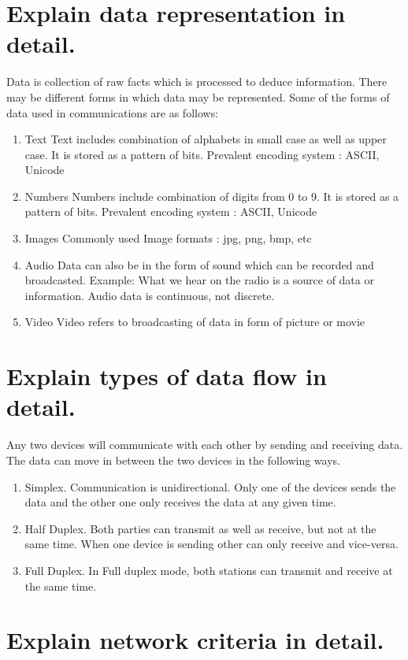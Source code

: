 \documentclass[a4paper,12pt]{report}
\begin{document}
\section*{Explain data representation in detail.}
Data is collection of raw facts which is processed to deduce information.
There may be different forms in which data may be represented.
Some of the forms of data used in communications are as follows:
\begin{enumerate}
\item Text
Text includes combination of alphabets in small case as well as upper case.
It is stored as a pattern of bits. Prevalent encoding system : ASCII, Unicode
\item Numbers
Numbers include combination of digits from 0 to 9.
It is stored as a pattern of bits. Prevalent encoding system : ASCII, Unicode
\item Images
Commonly used Image formats : jpg, png, bmp, etc
\item Audio
Data can also be in the form of sound which can be recorded and broadcasted. Example: What we hear on the radio is a source of data or information. Audio data is continuous, not discrete.
\item Video
Video refers to broadcasting of data in form of picture or movie
\end{enumerate}

\section*{Explain types of data flow in detail.}
Any two devices will communicate with each other by sending and receiving data. The data can move in between the two devices in the following ways.

\begin{enumerate}
\item  Simplex. Communication is unidirectional. Only one of the devices sends the data and the other one only receives the data at any given time. 
\item Half Duplex. Both parties can transmit as well as receive, but not at the same time. When one device is sending other can only receive and vice-versa.
\item  Full Duplex. In Full duplex mode, both stations can transmit and receive at the same time.
\end{enumerate}

\section*{Explain network criteria in detail.}
\end{document}
